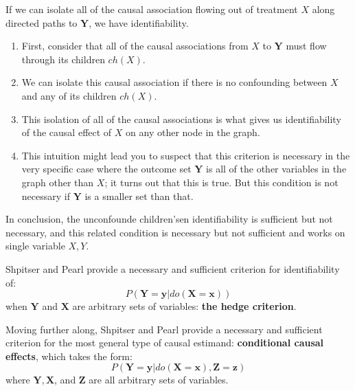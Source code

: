 If we can isolate all of the causal association flowing out of treatment $X$ along
directed paths to $\mathbf{Y}$, we have identifiability.
\begin{enumerate}
    \item First, consider that all of the causal associations from $X$ to $\mathbf{Y}$
          must flow through its children $ch(X)$.
    \item We can isolate this causal association if there is no confounding between
          $X$ and any of its children $ch(X)$.
    \item This isolation of all of the causal associations is what gives us
          identifiability of the causal effect of $X$ on any other node in the graph.
    \item This intuition might lead you to suspect that this criterion is necessary
          in the very specific case where the outcome set $\mathbf{Y}$ is all of
          the other variables in the graph other than $X$; it turns out that this
          is true. But this condition is not necessary if $\mathbf{Y}$ is a smaller
          set than that.
\end{enumerate}

In conclusion, the unconfounde children'sen identifiability is sufficient but not
necessary, and this related condition is necessary but not sufficient and works
on single variable $X, Y$.

Shpitser and Pearl provide a necessary and sufficient criterion for identifiability of:
\begin{equation}
    P(\mathbf{Y} = \mathbf{y}|do(\mathbf{X} = \mathbf{x}))
\end{equation}
when $\mathbf{Y}$ and $\mathbf{X}$ are arbitrary sets of variables: \textbf{the hedge criterion}.

Moving further along, Shpitser and Pearl provide a necessary and sufficient criterion
for the most general type of causal estimand: \textbf{conditional causal effects},
which takes the form:
\begin{equation}
    P(\mathbf{Y} = \mathbf{y}|do(\mathbf{X} = \mathbf{x}), \mathbf{Z} = \mathbf{z})
\end{equation}
where $\mathbf{Y}, \mathbf{X}$, and $\mathbf{Z}$ are all arbitrary sets of variables.